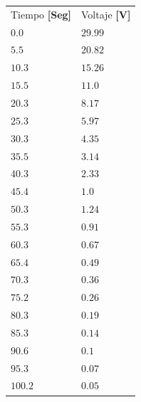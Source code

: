 \documentclass[twocolumn, 12pt]{article}
\begin{document}
\begin{table}[H]
    \centering
    \begin{tabularx}{0.9\linewidth}{|>{\centering\arraybackslash}X|>{\centering\arraybackslash}X|}

        \hline
        \multicolumn{2}{|c|}{Descarga}               \\\hline
        Tiempo \textbf{[Seg]} & Voltaje \textbf{[V]} \\\hline
        $0.0$                 & $29.99$              \\\hline
        $5.5$                 & $20.82$              \\\hline
        $10.3$                & $15.26$              \\\hline
        $15.5$                & $11.0$               \\\hline
        $20.3$                & $8.17$               \\\hline
        $25.3$                & $5.97$               \\\hline
        $30.3$                & $4.35$               \\\hline
        $35.5$                & $3.14$               \\\hline
        $40.3$                & $2.33$               \\\hline
        $45.4$                & $1.0$                \\\hline
        $50.3$                & $1.24$               \\\hline
        $55.3$                & $0.91$               \\\hline
        $60.3$                & $0.67$               \\\hline
        $65.4$                & $0.49$               \\\hline
        $70.3$                & $0.36$               \\\hline
        $75.2$                & $0.26$               \\\hline
        $80.3$                & $0.19$               \\\hline
        $85.3$                & $0.14$               \\\hline
        $90.6$                & $0.1$                \\\hline
        $95.3$                & $0.07$               \\\hline
        $100.2$               & $0.05$               \\\hline
    \end{tabularx}
\end{table}
\end{document}
